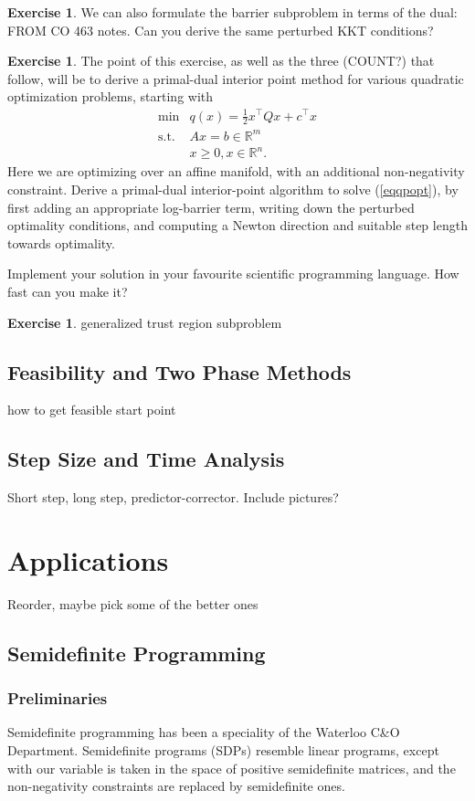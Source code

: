 \documentclass{article}
\numberwithin{equation}{section}
\theoremstyle{definition}
\newtheorem{exercise}[theorem]{Exercise}
\newcommand{\bR}{\mathbb{R}}
\newcommand{\tst}{\text{s.t.}}
\begin{document}
\begin{exercise}
    We can also formulate the barrier subproblem in terms of the dual: FROM CO 463 notes. Can you derive the same perturbed KKT conditions?
\end{exercise}
\begin{exercise}
    The point of this exercise, as well as the three (COUNT?) that follow, will be to derive a primal-dual interior point method for various quadratic optimization problems, starting with
    \begin{equation}
    \label{eqqpopt}
    \begin{array}{cc}
         \min & q(x)=\frac12x^\top Qx +c^\top x \\
         \tst & Ax=b\in\bR^m\\
              & x\ge 0, x\in\bR^n.
    \end{array}
    \end{equation}
    Here we are optimizing over an affine manifold, with an additional non-negativity constraint. Derive a primal-dual interior-point algorithm to solve (\ref{eqqpopt}), by first adding an appropriate log-barrier term, writing down the perturbed optimality conditions, and computing a Newton direction and suitable step length towards optimality.
    
    Implement your solution in your favourite scientific programming language. How fast can you make it?
\end{exercise}
\begin{exercise}
    generalized trust region subproblem
\end{exercise}
\subsection{Feasibility and Two Phase Methods}
how to get feasible start point
\subsection{Step Size and Time Analysis}
Short step, long step, predictor-corrector. Include pictures?
\section{Applications}
Reorder, maybe pick some of the better ones
\subsection{Semidefinite Programming}
\subsubsection{Preliminaries}
Semidefinite programming has been a speciality of the Waterloo C\&O Department. Semidefinite programs (SDPs) resemble linear programs, except with our variable is taken in the space of positive semidefinite matrices, and the non-negativity constraints are replaced by semidefinite ones.
\end{document}
